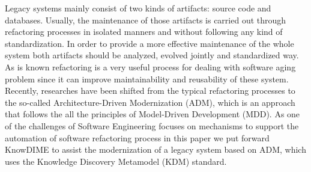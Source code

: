 Legacy systems mainly consist of two kinds of artifacts: source code and databases. Usually, the maintenance of those artifacts is carried out through refactoring processes in isolated manners and without following any kind of standardization. In order to provide a more effective maintenance of the whole system both artifacts should be analyzed, evolved jointly and standardized way. As is known refactoring is a very useful process for dealing with software aging problem since it can improve maintainability and reusability of these system. Recently, researches have been shifted from the typical refactoring processes to the so-called Architecture-Driven Modernization (ADM), which is an approach that follows the all the principles of Model-Driven Development (MDD). As one of the challenges of Software Engineering focuses on mechanisms to support the automation of software refactoring process in this paper we put forward KnowDIME to assist the modernization of a legacy system based on ADM, which uses the Knowledge Discovery Metamodel (KDM) standard. %